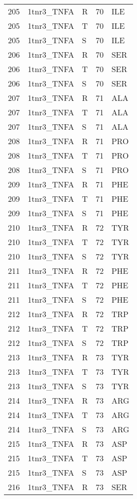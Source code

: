 \begin{tiny}
\begin{longtable}[l]{l|l|l|l|l}
	205 & 1tnr3\_TNFA & R & 70 & ILE \\
	205 & 1tnr3\_TNFA & T & 70 & ILE \\
	205 & 1tnr3\_TNFA & S & 70 & ILE \\
	206 & 1tnr3\_TNFA & R & 70 & SER \\
	206 & 1tnr3\_TNFA & T & 70 & SER \\
	206 & 1tnr3\_TNFA & S & 70 & SER \\
	207 & 1tnr3\_TNFA & R & 71 & ALA \\
	207 & 1tnr3\_TNFA & T & 71 & ALA \\
	207 & 1tnr3\_TNFA & S & 71 & ALA \\
	208 & 1tnr3\_TNFA & R & 71 & PRO \\
	208 & 1tnr3\_TNFA & T & 71 & PRO \\
	208 & 1tnr3\_TNFA & S & 71 & PRO \\
	209 & 1tnr3\_TNFA & R & 71 & PHE \\
	209 & 1tnr3\_TNFA & T & 71 & PHE \\
	209 & 1tnr3\_TNFA & S & 71 & PHE \\
	210 & 1tnr3\_TNFA & R & 72 & TYR \\
	210 & 1tnr3\_TNFA & T & 72 & TYR \\
	210 & 1tnr3\_TNFA & S & 72 & TYR \\
	211 & 1tnr3\_TNFA & R & 72 & PHE \\
	211 & 1tnr3\_TNFA & T & 72 & PHE \\
	211 & 1tnr3\_TNFA & S & 72 & PHE \\
	212 & 1tnr3\_TNFA & R & 72 & TRP \\
	212 & 1tnr3\_TNFA & T & 72 & TRP \\
	212 & 1tnr3\_TNFA & S & 72 & TRP \\
	213 & 1tnr3\_TNFA & R & 73 & TYR \\
	213 & 1tnr3\_TNFA & T & 73 & TYR \\
	213 & 1tnr3\_TNFA & S & 73 & TYR \\
	214 & 1tnr3\_TNFA & R & 73 & ARG \\
	214 & 1tnr3\_TNFA & T & 73 & ARG \\
	214 & 1tnr3\_TNFA & S & 73 & ARG \\
	215 & 1tnr3\_TNFA & R & 73 & ASP \\
	215 & 1tnr3\_TNFA & T & 73 & ASP \\
	215 & 1tnr3\_TNFA & S & 73 & ASP \\
	216 & 1tnr3\_TNFA & R & 73 & SER \\

\end{longtable}
\end{tiny}

